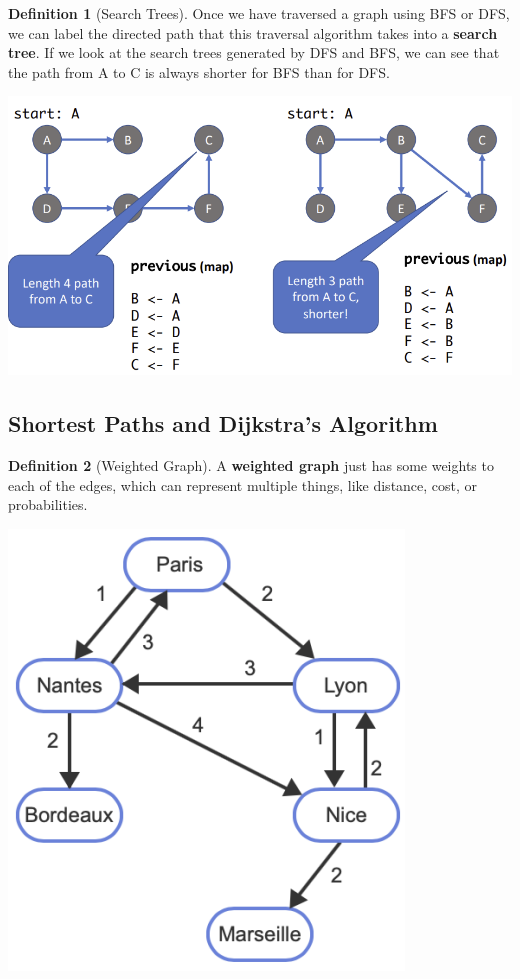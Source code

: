 \documentclass{article}
\theoremstyle{definition}
\theoremstyle{remark}
\theoremstyle{definition}
\newtheorem{definition}{Definition}[section]
\begin{document}
\begin{definition}[Search Trees]
Once we have traversed a graph using BFS or DFS, we can label the directed path that this traversal algorithm takes into a \textbf{search tree}. If we look at the search trees generated by DFS and BFS, we can see that the path from A to C is always shorter for BFS than for DFS. 
\begin{center}
    \includegraphics[scale=0.4]{img/search_trees.png}
\end{center}
\end{definition}



\subsection{Shortest Paths and Dijkstra's Algorithm}

\begin{definition}[Weighted Graph]
A \textbf{weighted graph} just has some weights to each of the edges, which can represent multiple things, like distance, cost, or probabilities. 
\begin{center}
    \includegraphics[scale=0.5]{img/weighted_graph.png}
\end{center}
\end{definition}
\end{document}

